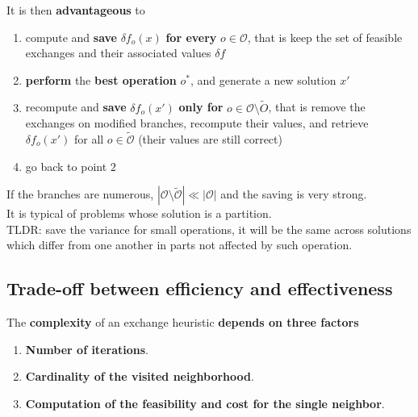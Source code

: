 \documentclass[11pt]{article}
\begin{document}
	It is then \textbf{advantageous} to
	\begin{enumerate}
		\item compute and \textbf{save} $\delta f_o (x)$ \textbf{for every} $o \in \mathcal{O}$, that is keep the set of feasible exchanges and their associated values $\delta f$
		
		\item \textbf{perform} the \textbf{best operation} $o^\ast$, and generate a new solution $x'$
		
		\item recompute and \textbf{save} $\delta f_o (x')$ \textbf{only for} $o ∈ \mathcal{O} \setminus \tilde{O}$, that is remove the exchanges on modified branches, recompute their values, and retrieve $\delta f_o (x')$ for all $o \in \tilde{\mathcal{O}}$ (their values are still correct)
		
		\item go back to point $2$
	\end{enumerate}
	
	If the branches are numerous, $|\mathcal{O} \setminus \tilde{\mathcal{O}}| \ll |\mathcal{O}|$ and the saving is very strong.\\
	It is typical of problems whose solution is a partition.\\
	
	TLDR: save the variance for small operations, it will be the same across solutions which differ from one another in parts not affected by such operation.\\
	
	\newpage
	
	\subsection{Trade-off between efficiency and effectiveness}
	The \textbf{complexity} of an exchange heuristic \textbf{depends on three factors}
	\begin{enumerate}
		\item \textbf{Number of iterations}.\\
		
		\item \textbf{Cardinality of the visited neighborhood}.\\
		
		\item \textbf{Computation of the feasibility and cost for the single neighbor}.\\
		
	\end{enumerate}
	
\end{document}
